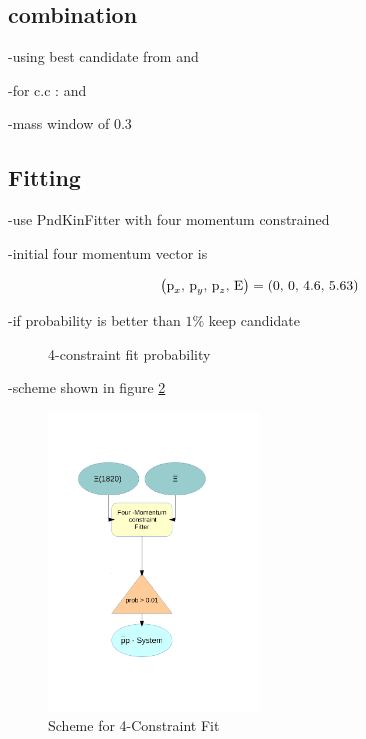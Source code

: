 	\subsection{combination}
	
	-using best candidate from \excitedcascade and \anticascade
	
	-for c.c : \excitedanticascade and \cascade
	
	-mass window of $0.3$\massunit
	
	
	\subsection{Fitting}
	
	-use PndKinFitter with four momentum constrained
	
	-initial four momentum vector is 
	\begin{center}
		\begin{equation}\nonumber
			\left(\textnormal{p}_x,\, \textnormal{p}_y,\, \textnormal{p}_z,\, \textnormal{E} \right) = \left(0,\, 0,\, 4.6,\, 5.63 \right)
		\end{equation}
	\end{center}
	
	
	-if probability is better than $1\%$ keep candidate
	
	\begin{figure}
		\centering
		\caption{4-constraint fit probability}
		\label{fig:xisys_prob}
	\end{figure}
	
	-scheme shown in figure \ref{fig:fourconstraintfit}
	
	\begin{figure}
		\centering
			\includegraphics[width=0.50\textwidth]{./plots/combineCascadeSys.pdf}
		\caption{Scheme for 4-Constraint Fit}
		\label{fig:fourconstraintfit}
	\end{figure}